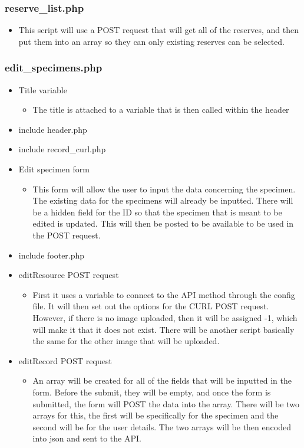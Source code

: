     \subsubsection{reserve\_list.php}
        \begin{itemize}
            \item This script will use a POST request that will get all of the reserves, and then put them into an array so they can only existing reserves can be selected.
        \end{itemize}

    \subsubsection{edit\_specimens.php}
        \begin{itemize}
            \item Title variable
            \begin{itemize}
                \item The title is attached to a variable that is then called within the header
            \end{itemize}
            \item include header.php 
            \item include record\_curl.php
            \item Edit specimen form
            \begin{itemize}
                \item This form will allow the user to input the data concerning the specimen. The existing data for the specimens will already be inputted. There will be a hidden field for the ID so that the specimen that is meant to be edited is updated. This will then be posted to be available to be used in the POST request.
            \end{itemize}
            \item include footer.php
            \item editResource POST request
            \begin{itemize}
                \item First it uses a variable to connect to the API method through the config file. It will then set out the options for the CURL POST request. However, if there is no image uploaded, then it will be assigned -1, which will make it that it does not exist. There will be another script basically the same for the other image that will be uploaded.
            \end{itemize}
            \item editRecord POST request
            \begin{itemize}
                \item An array will be created for all of the fields that will be inputted in the form. Before the submit, they will be empty, and once the form is submitted, the form will POST the data into the array. There will be two arrays for this, the first will be specifically for the specimen and the second will be for the user details. The two arrays will be then encoded into json and sent to the API. 
            \end{itemize}
        \end{itemize}
